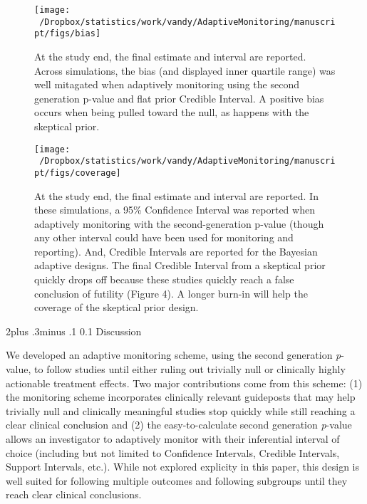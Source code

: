 \documentclass[12pt,oneside]{book}
\makeatletter
\newlength{\li}\setlength{\li}{14.48pt}
\newlength{\di}\setlength{\di}{-3.5mm}
\renewcommand\section{ \@startsection {section}{1}{\z@}%
    {2\@bls  plus .3\@bls minus .1\@bls}%
    {0.1\@bls}%
    {\centering\normalfont}}
\theoremstyle{definition}
\theoremstyle{definition}
\theoremstyle{definition}
\theoremstyle{remark}
\makeatother
\begin{document}
\begin{figure}[H]

{\centering \texttt{[image: ~/Dropbox/statistics/work/vandy/AdaptiveMonitoring/manuscript/figs/bias]} 

}

\caption{At the study end, the final estimate and interval are reported.  Across simulations, the bias (and displayed inner quartile range) was well mitagated when adaptively monitoring using the second generation p-value and flat prior Credible Interval.  A positive bias occurs when being pulled toward the null, as happens with the skeptical prior.}\label{fig:bias}
\end{figure}

\begin{figure}[H]

{\centering \texttt{[image: ~/Dropbox/statistics/work/vandy/AdaptiveMonitoring/manuscript/figs/coverage]} 

}

\caption{At the study end, the final estimate and interval are reported.  In these simulations, a 95\% Confidence Interval was reported when adaptively monitoring with the second-generation p-value (though any other interval could have been used for monitoring and reporting).  And, Credible Intervals are reported for the Bayesian adaptive designs.  The final Credible Interval from a skeptical prior quickly drops off because these studies quickly reach a false conclusion of futility (Figure 4).  A longer burn-in will help the coverage of the skeptical prior design.}\label{fig:coverage}
\end{figure}

\hypertarget{discussion}{%
\section{Discussion}\label{discussion}}

We developed an adaptive monitoring scheme, using the second generation
\emph{p}-value, to follow studies until either ruling out trivially null
or clinically highly actionable treatment effects. Two major
contributions come from this scheme: (1) the monitoring scheme
incorporates clinically relevant guideposts that may help trivially null
and clinically meaningful studies stop quickly while still reaching a
clear clinical conclusion and (2) the easy-to-calculate second
generation \emph{p}-value allows an investigator to adaptively monitor
with their inferential interval of choice (including but not limited to
Confidence Intervals, Credible Intervals, Support Intervals, etc.).
While not explored explicity in this paper, this design is well suited
for following multiple outcomes and following subgroups until they reach
clear clinical conclusions.
\end{document}
